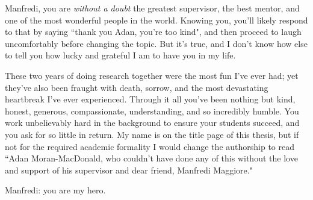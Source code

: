 

\begin{acknowledgements}
    Manfredi, you are \textit{without a doubt} the greatest supervisor, the
    best mentor, and one of the most wonderful people in the world.
    Knowing you, you'll likely respond to that by saying 
    ``thank you Adan, you're too kind", and then proceed to laugh uncomfortably before
    changing the topic.
    But it's true, and I don't know how else to tell you how lucky and grateful I am to
    have you in my life.

    These two years of doing research together were the most fun I've ever
    had; yet they've also been fraught with death, sorrow, and the most
    devastating heartbreak I've ever experienced.
    Through it all you've been nothing but kind, honest, generous,
    compassionate, understanding, and so incredibly humble.
    You work unbelievably hard in the background to ensure your students succeed, and you
    ask for so little in return.
    My name is on the title page of this thesis, but if not for the required
    academic formality I would change the authorship to read
    ``Adan Moran-MacDonald, who couldn't have done any of this without the love
    and support of his supervisor and dear friend, Manfredi Maggiore."

    Manfredi: you are my hero. 


\end{acknowledgements}

